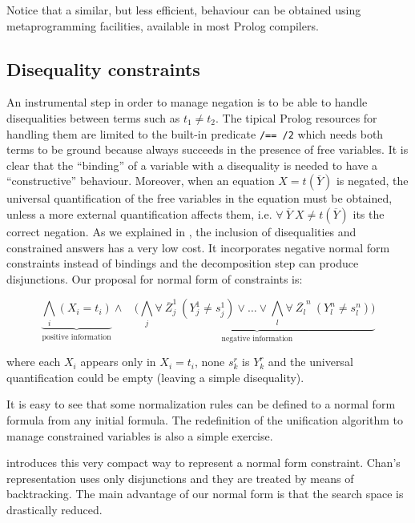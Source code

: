 \documentclass{llncs}
\begin{document}
Notice that a similar, but less efficient, behaviour can be obtained using
metaprogramming facilities, available in most Prolog compilers.
 


\subsection{Disequality constraints}
\label{disequality}

An instrumental step in order to manage negation is to be able to
handle disequalities between terms such as $t_1 \neq t_2$.  The
tipical Prolog resources for handling them are limited to the built-in
predicate {\tt /== /2} which needs both terms to be ground because
always succeeds in the presence of free variables.  It is clear that
the ``binding'' of a variable with a disequality is needed to have a
``constructive'' behaviour.  Moreover, when an equation $X =
t(\overline{Y})$ is negated, the universal quantification of the free
variables in the equation must be obtained, unless a more external
quantification affects them, i.e. $\forall~ \overline{Y}~X \neq
t(\overline{Y})$ its the correct negation.  As we explained in
\cite{SusanaPADL2000}, the inclusion of disequalities and constrained
answers has a very low cost. It incorporates negative normal form
constraints instead of bindings and the decomposition step can produce
disjunctions. Our proposal for normal form of constraints is:

\[ \underbrace{\bigwedge_i (X_i = t_i)}_{\mbox{positive information}} \wedge~~~~ (
\underbrace{\bigwedge_j \forall~ \overline{Z}_j^1~(Y_j^1 \neq s_j^1)
\vee \ldots \vee \bigwedge_l \forall~ \overline{Z_l}^n~(Y_l^n \neq
s_l^n) )}_{\mbox{negative information}} \]

\noindent
where each $X_i$ appears only in $X_i = t_i$, none $s_k^r$ is $Y_k^r$
and the universal quantification could be empty (leaving a simple
disequality).

It is easy to see that some normalization rules can be defined to a
normal form formula from any initial formula. The redefinition of the
unification algorithm to manage constrained variables is also a simple
exercise.

\cite{Moreno1} introduces this very compact way to represent a normal
form constraint.  Chan's representation uses only disjunctions and
they are treated by means of backtracking. The main advantage of our
normal form is that the search space is drastically reduced.
\end{document}
